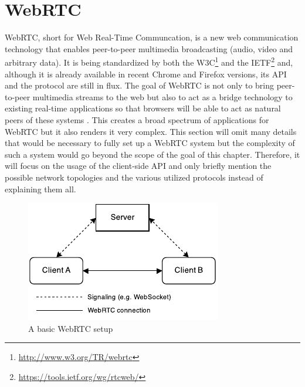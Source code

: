 \section{WebRTC}
\label{realtime-webrtc}

WebRTC, short for Web Real-Time Communcation, is a new web communication technology that enables peer-to-peer multimedia broadcasting (audio, video and arbitrary data). It is being standardized by both the W3C\footnote{\url{http://www.w3.org/TR/webrtc}} and the IETF\footnote{\url{https://tools.ietf.org/wg/rtcweb/}} and, although it is already available in recent Chrome and Firefox versions, its API and the protocol are still in flux. The goal of WebRTC is not only to bring peer-to-peer multimedia streams to the web but also to act as a bridge technology to existing real-time applications so that browsers will be able to act as natural peers of these systems \cite[p. 310ff]{grigorik2013high}. This creates a broad spectrum of applications for WebRTC but it also renders it very complex. This section will omit many details that would be necessary to fully set up a WebRTC system but the complexity of such a system would go beyond the scope of the goal of this chapter. Therefore, it will focus on the usage of the client-side API and only briefly mention the possible network topologies and the various utilized protocols instead of explaining them all.

\begin{figure}[htb]
  \centerline{\includegraphics[width=0.9\linewidth]{images/WebRTC_connection.pdf}}
  \caption[A basic WebRTC setup]{A basic WebRTC setup}
  \label{fig:webrtc}
\end{figure}

